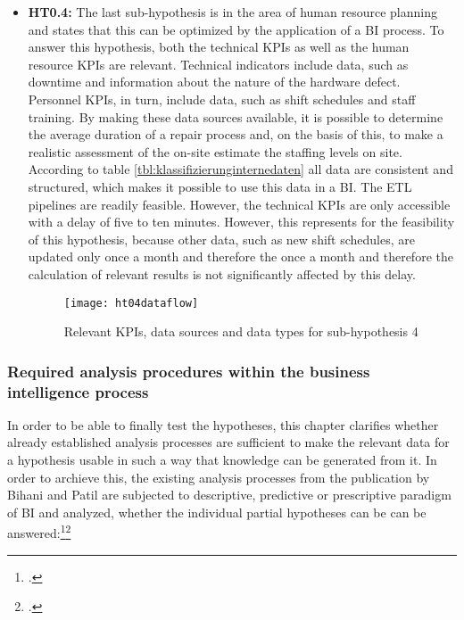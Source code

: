 \begin{itemize}
    \item \textbf{\ac{HT0.4}: }The last sub-hypothesis is in the area of human resource planning and states that this
    can be optimized by the application of a \ac{BI} process. To answer this hypothesis, both
    the technical \acp{KPI} as well as the human resource \acp{KPI} are relevant. Technical indicators include data,
    such as downtime and information about the nature of the hardware defect. Personnel \acp{KPI}, in turn, include data,
    such as shift schedules and staff training. By making these data sources available, it is possible to determine the
    average duration of a repair process and, on the basis of this, to make a realistic assessment of the on-site
    estimate the staffing levels on site. According to table \ref{tbl:klassifizierunginternedaten} all data are consistent and structured,
    which makes it possible to use this data in a \ac{BI}. The \ac{ETL} pipelines are readily feasible.
    However, the technical \acp{KPI} are only accessible with a delay of five to ten minutes. However, this represents
    for the feasibility of this hypothesis, because other data, such as new shift schedules, are updated only once a month and therefore the
    once a month and therefore the calculation of relevant results is not significantly affected by this delay.

    \begin{figure}[H]
        \caption{Relevant KPIs, data sources and data types for sub-hypothesis 4}
        \texttt{[image: ht04dataflow]}
        \label{figure:ht04dataflow}
    \end{figure}
\end{itemize}

\subsubsection{Required analysis procedures within the business intelligence process} \label{toc:analyseverfahrenbi}

In order to be able to finally test the hypotheses, this chapter clarifies whether already established analysis processes are sufficient
to make the relevant data for a hypothesis usable in such a way that knowledge can be generated from it. In order to archieve this,
the existing analysis processes from the publication by Bihani and Patil are subjected to descriptive, predictive or prescriptive
paradigm of \ac{BI} and analyzed, whether the individual partial hypotheses can be
can be answered:\footcite[Cf.][pp. 97]{bihani2014comparative}\footcite[Cf.][Fig. 2]{bihani2014comparative}

